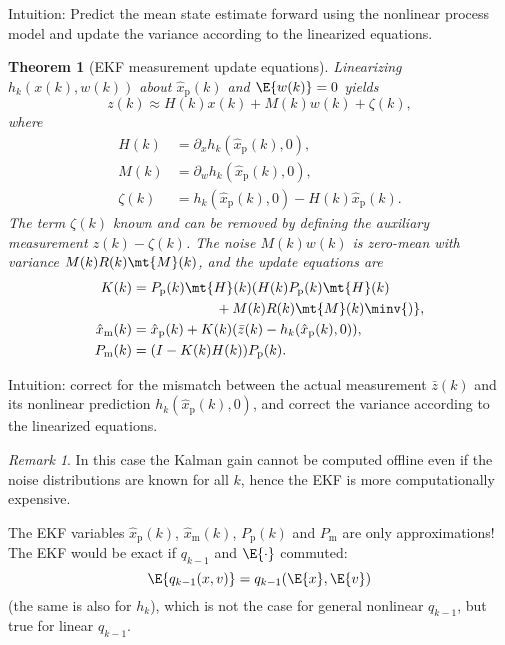 \documentclass[]{hsrzf}
\theoremstyle{plain}
\newtheorem{thm}{Theorem}[section]
\theoremstyle{definition}
\theoremstyle{remark}
\newtheorem*{remark}{Remark}
\begin{document}
Intuition: Predict the mean state estimate forward using the nonlinear process
model and update the variance according to the linearized equations.

\begin{thm}[EKF measurement update equations]
  Linearizing \allowbreak $h_k(x(k), w(k))$ about $\hat{x}_\mathrm{p}(k)$ and $\E{w(k)} =
  0$ yields
  \[
    z(k) \approx H(k) x(k) + M(k) w(k) + \zeta(k),
  \]
  where
  \begin{align*}
    H(k) &= \partial_x h_{k}(\hat{x}_\mathrm{p}(k), 0), \\
    M(k) &= \partial_w h_{k}(\hat{x}_\mathrm{p}(k), 0), \\
    \zeta(k) &= h_k(\hat{x}_\mathrm{p}(k), 0) - H(k) \hat{x}_\mathrm{p}(k).
  \end{align*}
  The term $\zeta(k)$ known and can be removed by defining the auxiliary
  measurement $z(k) - \zeta(k)$. The noise $M(k)w(k)$ is zero-mean with
  variance $M(k)R(k)\mt{M}(k)$, and the update equations are
  \begin{align*}
    K(k) &= P_\mathrm{p}(k) \mt{H}(k) (
        H(k) P_\mathrm{p}(k) \mt{H}(k) \\
        &\qquad\qquad\qquad + M(k) R(k) \mt{M}(k) \minv{)}, \\
    \hat{x}_\mathrm{m}(k) &= \hat{x}_\mathrm{p}(k) + K(k) (
        \bar{z}(k) - h_k(\hat{x}_\mathrm{p}(k), 0)), \\
    P_\mathrm{m}(k) &= (I - K(k)H(k)) P_\mathrm{p}(k).
  \end{align*}
\end{thm}

Intuition: correct for the mismatch between the actual measurement
$\bar{z}(k)$ and its nonlinear prediction $h_k(\hat{x}_\mathrm{p}(k), 0)$,
and correct the variance according to the linearized equations.

\begin{remark}
  In this case the Kalman gain cannot be computed offline even if the noise
  distributions are known for all $k$, hence the EKF is more computationally
  expensive.
\end{remark}

The EKF variables $\hat{x}_\mathrm{p}(k)$, $\hat{x}_\mathrm{m}(k)$,
$P_\mathrm{p}(k)$ and $P_\mathrm{m}$ are only approximations! The EKF would be
exact if $q_{k-1}$ and $\E{\cdot}$ commuted:
\[
  \E{q_{k-1}(x, v)} = q_{k-1}(\E{x}, \E{v})
\]
(the same is also for $h_k$), which is not the case for general nonlinear
$q_{k-1}$, but true for linear $q_{k-1}$.
\end{document}
